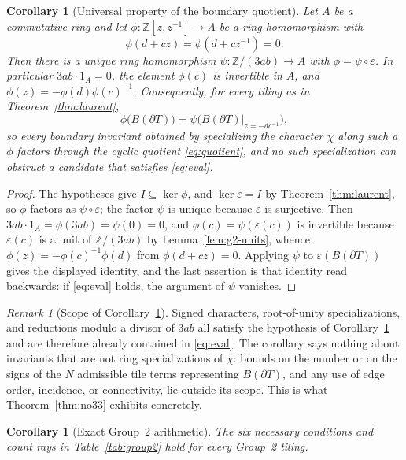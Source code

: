 \documentclass[11pt]{amsart}
\newtheorem{corollary}[theorem]{Corollary}
\theoremstyle{definition}
\theoremstyle{remark}
\newtheorem{remark}[theorem]{Remark}
\newcommand{\Z}{\mathbb Z}
\begin{document}
\begin{corollary}[Universal property of the boundary quotient]
\label{cor:laurent-universal}
Let $A$ be a commutative ring and let $\phi:\Z[z,z^{-1}]\to A$ be a ring
homomorphism with
\[
             \phi(d+cz)=\phi(d+cz^{-1})=0 .
\]
Then there is a unique ring homomorphism $\psi:\Z/(3ab)\to A$ with
$\phi=\psi\circ\varepsilon$.  In particular $3ab\cdot1_A=0$, the element
$\phi(c)$ is invertible in $A$, and $\phi(z)=-\phi(d)\phi(c)^{-1}$.
Consequently, for every tiling as in Theorem~\ref{thm:laurent},
\[
 \phi\big(B(\partial T)\big)
 =\psi\Big(B(\partial T)\big|_{z=-dc^{-1}}\Big),
\]
so every boundary invariant obtained by specializing the character $\chi$
along such a $\phi$ factors through the cyclic quotient
\eqref{eq:quotient}, and no such specialization can obstruct a candidate that
satisfies \eqref{eq:eval}.
\end{corollary}

\begin{proof}
The hypotheses give $I\subseteq\ker\phi$, and $\ker\varepsilon=I$ by
Theorem~\ref{thm:laurent}, so $\phi$ factors as $\psi\circ\varepsilon$; the
factor $\psi$ is unique because $\varepsilon$ is surjective.  Then
$3ab\cdot1_A=\phi(3ab)=\psi(0)=0$, and $\phi(c)=\psi(\varepsilon(c))$ is
invertible because $\varepsilon(c)$ is a unit of $\Z/(3ab)$ by
Lemma~\ref{lem:g2-units}, whence
$\phi(z)=-\phi(c)^{-1}\phi(d)$ from $\phi(d+cz)=0$.  Applying $\psi$ to
$\varepsilon(B(\partial T))$ gives the displayed identity, and the last
assertion is that identity read backwards: if \eqref{eq:eval} holds, the
argument of $\psi$ vanishes.
\end{proof}

\begin{remark}[Scope of Corollary~\ref{cor:laurent-universal}]
\label{rem:laurent-scope}
Signed characters, root-of-unity specializations, and reductions modulo a
divisor of $3ab$ all satisfy the hypothesis of
Corollary~\ref{cor:laurent-universal} and are therefore already contained in
\eqref{eq:eval}.  The corollary says nothing about invariants that are not
ring specializations of $\chi$: bounds on the number or on the signs of the
$N$ admissible tile terms representing $B(\partial T)$, and any use of edge
order, incidence, or connectivity, lie outside its scope.  This is what
Theorem~\ref{thm:no33} exhibits concretely.
\end{remark}

\begin{corollary}[Exact Group~2 arithmetic]\label{cor:rows}
The six necessary conditions and count rays in
Table~\ref{tab:group2} hold for every Group~2 tiling.
\end{corollary}
\end{document}
